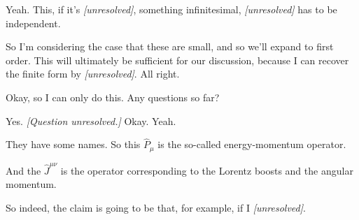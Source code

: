 
Yeah. This, if it's \textit{[unresolved]}, something infinitesimal,
\textit{[unresolved]} has to be independent.

So I'm considering the case that these are small, and so we'll expand to first
order. This will ultimately be sufficient for our discussion, because I can
recover the finite form by \textit{[unresolved]}. All right.

Okay, so I can only do this. Any questions so far?

Yes. \textit{[Question unresolved.]} Okay. Yeah.

They have some names. So this $\hat P_\mu$ is the so-called energy-momentum
operator.

And the $\hat J^{\mu\nu}$ is the operator corresponding to the Lorentz boosts
and the angular momentum.

So indeed, the claim is going to be that, for example, if I
\textit{[unresolved]}.

